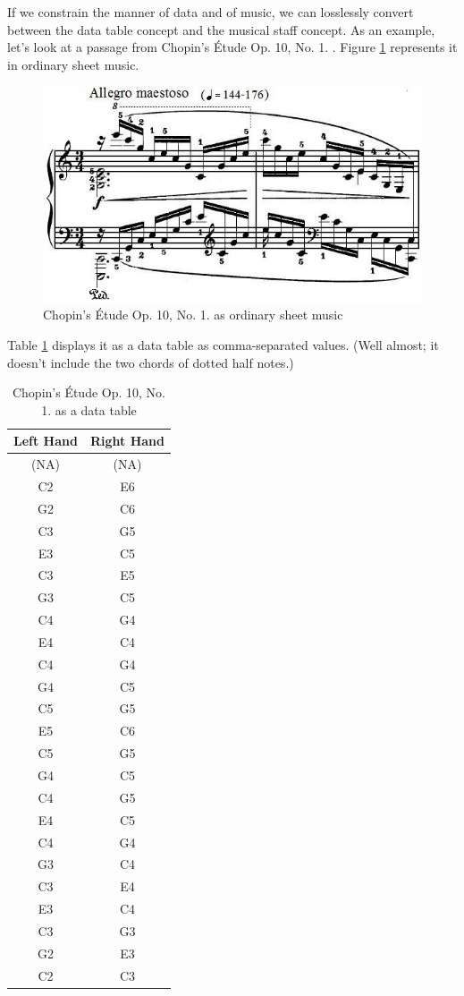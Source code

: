 \documentclass{acm_proc_article-sp}
\begin{document}
If we constrain the manner of data and of music, we can losslessly convert
between the data table concept and the musical staff concept. As an example,
let's look at a passage from Chopin's \'Etude Op. 10, No. 1. \cite{chopin}.
Figure \ref{sheet} represents it in ordinary sheet music.

\begin{figure}
\label{sheet}
\includegraphics[width=\textwidth]{chopin.png}
\caption{Chopin's \'Etude Op. 10, No. 1. as ordinary sheet music}
\end{figure}

Table \ref{table} displays it as a data table as comma-separated values.
(Well almost; it doesn't include the two chords of dotted half notes.)

\begin{table}
\label{table}
\centering
\begin{tabular}{c c} \hline
Left Hand&Right Hand\\ \hline
   (NA)  &   (NA)\\
    C2   &    E6\\
    G2   &    C6\\
    C3   &    G5\\
    E3   &    C5\\
    C3   &    E5\\
    G3   &    C5\\
    C4   &    G4\\
    E4   &    C4\\
    C4   &    G4\\
    G4   &    C5\\
    C5   &    G5\\
    E5   &    C6\\
    C5   &    G5\\
    G4   &    C5\\
    C4   &    G5\\
    E4   &    C5\\
    C4   &    G4\\
    G3   &    C4\\
    C3   &    E4\\
    E3   &    C4\\
    C3   &    G3\\
    G2   &    E3\\
    C2   &    C3\\ \hline
\end{tabular}
\caption{Chopin's \'Etude Op. 10, No. 1. as a data table}
\end{table}
\end{document}

